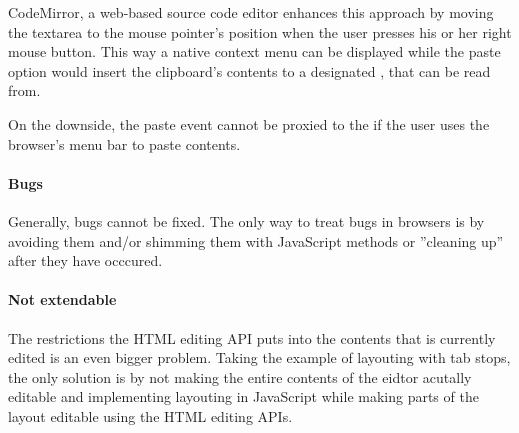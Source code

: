 CodeMirror, a web-based source code editor enhances this approach by moving the textarea to the mouse pointer's position when the user presses his or her right mouse button. This way a native context menu can be displayed while the paste option would insert the clipboard's contents to a designated , that can be read from.

On the downside, the paste event cannot be proxied to the  if the user uses the browser's menu bar to paste contents.


\paragraph{Bugs} Generally, bugs cannot be fixed. The only way to treat bugs in browsers is by avoiding them and/or shimming them with JavaScript methods or ''cleaning up'' after they have occcured.

\paragraph{Not extendable} The restrictions the HTML editing API puts into the contents that is currently edited is an even bigger problem. Taking the example of layouting with tab stops, the only solution is by not making the entire contents of the eidtor acutally editable and implementing layouting in JavaScript while making parts of the layout editable using the HTML editing APIs.



